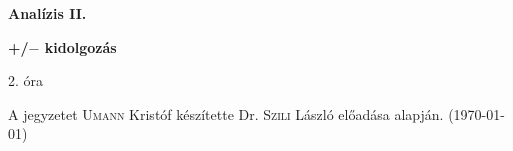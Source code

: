 \documentclass[a4paper,11.5pt]{article}
\begin{document}
	\setlength\parindent{0pt}
	\def\s{\hspace{0.2mm}\vphantom{\beta}}
	\def\Z{\mathbb{Z}}
	\def\Q{\mathbb{Q}}
	\def\R{\mathbb{R}}
	\def\C{\mathbb{C}}
	\def\N{\mathbb{N}}
	\def\Ra{\overline{\mathbb{R}}}
	
	\def\sume{\displaystyle\sum_{n=1}^{+\infty}}
	\def\sumn{\displaystyle\sum_{n=0}^{+\infty}}
	
	\def\narrow{\underset{n\rightarrow+\infty}{\longrightarrow}}
	\def\limn{\displaystyle\lim_{n\to +\infty}}
	\def\limx{\displaystyle\lim_{x\to +\infty}}
	
	\theoremstyle{definition}
	\newtheorem{theorem}{Tétel}[subsection] 
	
	\theoremstyle{definition}
	\newtheorem{definition}[theorem]{Definíció} 
	\newtheorem{example}[theorem]{Példa} 
	\newtheorem{task}[theorem]{Feladat} 
	\newtheorem{note}[theorem]{Megjegyzés}
	\begin{center}
		{\LARGE \textbf{Analízis II.}}
		
		{\large \textbf{+/$-$ kidolgozás}}
		
		2. óra
	\end{center}
	A jegyzetet \textsc{Umann} Kristóf készítette Dr. \textsc{Szili} László előadása alapján. (\today)
	
\end{document}
